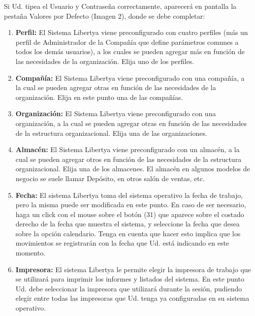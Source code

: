 \documentclass[letterpaper,10pt,spanish]{sphinxmanual}
\begin{document}
Si Ud. tipea el Usuario y Contraseña correctamente, aparecerá en pantalla la pestaña Valores por Defecto (Imagen 2), donde se debe completar:
\begin{enumerate}
\item {} 
\textbf{Perfil:} El Sistema Libertya viene preconfigurado con cuatro perfiles (más un perfil de Administrador de la Compañía que define parámetros comunes a todos los demás usuarios), a los cuales se pueden agregar más en función de las necesidades de la organización. Elija uno de los perfiles.

\item {} 
\textbf{Compañía:} El Sistema Libertya viene preconfigurado con una compañía, a la cual se pueden agregar otras en función de las necesidades de la organización. Elija en este punto una de las compañías.

\item {} 
\textbf{Organización:} El Sistema Libertya viene preconfigurado con una organización, a la cual se pueden agregar otras en función de las necesidades de la estructura organizacional. Elija una de las organizaciones.

\item {} 
\textbf{Almacén:} El Sistema Libertya viene preconfigurado con un almacén, a la cual se pueden agregar otros en función de las necesidades de la estructura organizacional. Elija una de los almacenes. El almacén en algunos modelos de negocio se suele llamar Depósito, en otros salón de ventas, etc.

\item {} 
\textbf{Fecha:} El sistema Libertya toma del sistema operativo la fecha de trabajo, pero la misma puede ser modificada en este punto. En caso de ser necesario, haga un click con el mouse sobre el botón (31) que aparece sobre el costado derecho de la fecha que muestra el sistema, y seleccione la fecha que desea sobre la opción calendario. Tenga en cuenta que hacer esto implica que los movimientos se registrarán con la fecha que Ud. está indicando en este momento.

\item {} 
\textbf{Impresora:} El sistema Libertya le permite elegir la impresora de trabajo que se utilizará para imprimir los informes y listados del sistema. En este punto Ud. debe seleccionar la impresora que utilizará durante la sesión, pudiendo elegir entre todas las impresoras que Ud. tenga ya configuradas en su sistema operativo.

\end{enumerate}
\end{document}
